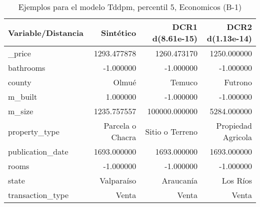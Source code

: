 \begin{table}[H]
\centering
\fontsize{10}{14}\selectfont
\caption{Ejemplos para el modelo Tddpm, percentil 5, Economicos (B-1)}
\label{table-example-economicos-b-1-tddpm_mlp-5p}
\begin{tabular}{|l|r|r|r|}
\hline
\rowcolor[gray]{0.8}
Variable/Distancia & Sintético & DCR1 d(8.61e-15) & DCR2 d(1.13e-14) \\
\hline \_price & \cellcolor[rgb]{0.9, 0.54, 0.52} 1293.477878 & 1260.473170 & 1250.000000 \\
\hline bathrooms & \cellcolor[rgb]{0.9, 0.54, 0.52} -1.000000 & \cellcolor[rgb]{0.9, 0.54, 0.52} -1.000000 & \cellcolor[rgb]{0.9, 0.54, 0.52} -1.000000 \\
\hline county & \cellcolor[rgb]{0.9, 0.54, 0.52} Olmué & Temuco & Futrono \\
\hline m\_built & \cellcolor[rgb]{0.9, 0.54, 0.52} 1.000000 & -1.000000 & -1.000000 \\
\hline m\_size & \cellcolor[rgb]{0.9, 0.54, 0.52} 1235.757557 & 100000.000000 & 5284.000000 \\
\hline property\_type & \cellcolor[rgb]{0.9, 0.54, 0.52} Parcela o Chacra & Sitio o Terreno & Propiedad Agricola \\
\hline publication\_date & \cellcolor[rgb]{0.9, 0.54, 0.52} 1693.000000 & \cellcolor[rgb]{0.9, 0.54, 0.52} 1693.000000 & \cellcolor[rgb]{0.9, 0.54, 0.52} 1693.000000 \\
\hline rooms & \cellcolor[rgb]{0.9, 0.54, 0.52} -1.000000 & \cellcolor[rgb]{0.9, 0.54, 0.52} -1.000000 & \cellcolor[rgb]{0.9, 0.54, 0.52} -1.000000 \\
\hline state & \cellcolor[rgb]{0.9, 0.54, 0.52} Valparaíso & Araucanía & Los Ríos \\
\hline transaction\_type & \cellcolor[rgb]{0.9, 0.54, 0.52} Venta & \cellcolor[rgb]{0.9, 0.54, 0.52} Venta & \cellcolor[rgb]{0.9, 0.54, 0.52} Venta \\
\hline
\end{tabular}
\end{table}

